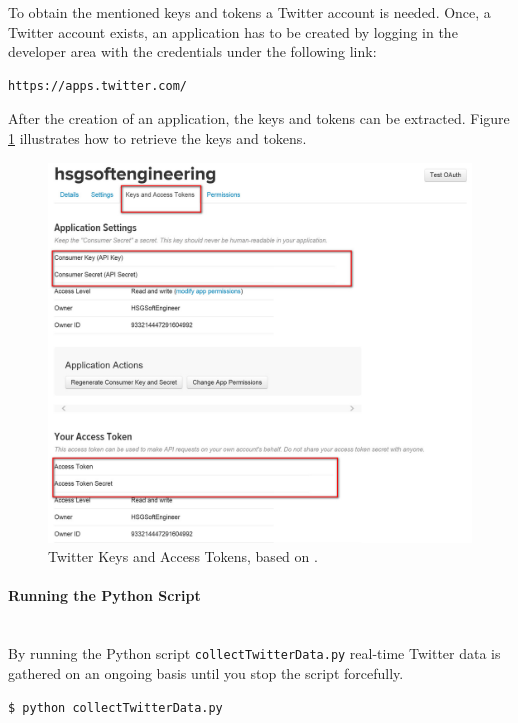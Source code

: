 \documentclass[a4paper,12pt]{article}
\begin{document}
\begin{spacing}{1.2}
To obtain the mentioned keys and tokens a Twitter account is needed. Once, a Twitter account exists, an application has to be created by logging in the developer area with the credentials under the following link: 
\begin{lstlisting}[language=bash]
https://apps.twitter.com/
\end{lstlisting}

After the creation of an application, the keys and tokens can be extracted. Figure \ref{figkeysandtokens} illustrates how to retrieve the keys and tokens.\\
\begin{figure}[H]
\centering
\includegraphics[scale=0.6]{twitteraccess}
\caption{Twitter Keys and Access Tokens, based on \textcite{twitterinc2017c}.}
\label{figkeysandtokens}
\end{figure}

\paragraph{Running the Python Script}\mbox{}\\{}
By running the Python script \verb|collectTwitterData.py| real-time Twitter data is gathered on an ongoing basis until you stop the script forcefully.
\begin{lstlisting}[language=bash]
    $ python collectTwitterData.py
    \end{lstlisting}


\end{spacing}
\end{document}
